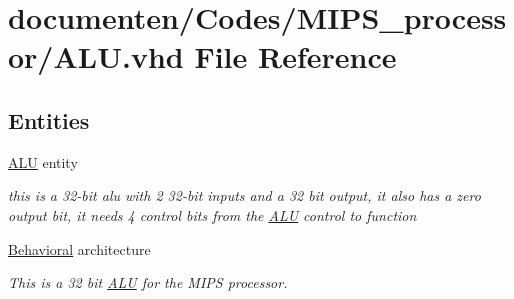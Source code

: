 \hypertarget{_a_l_u_8vhd}{\section{documenten/\-Codes/\-M\-I\-P\-S\-\_\-processor/\-A\-L\-U.vhd File Reference}
\label{_a_l_u_8vhd}
}
\subsection*{Entities}
\begin{DoxyCompactItemize}
\item 
\hyperlink{class_a_l_u}{A\-L\-U} entity
\begin{DoxyCompactList}\small\item\em this is a 32-\/bit alu with 2 32-\/bit inputs and a 32 bit output, it also has a zero output bit, it needs 4 control bits from the \hyperlink{class_a_l_u}{A\-L\-U} control to function \end{DoxyCompactList}\item 
\hyperlink{class_a_l_u_1_1_behavioral}{Behavioral} architecture
\begin{DoxyCompactList}\small\item\em This is a 32 bit \hyperlink{class_a_l_u}{A\-L\-U} for the M\-I\-P\-S processor. \end{DoxyCompactList}\end{DoxyCompactItemize}
